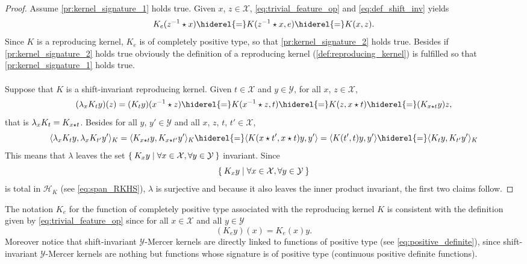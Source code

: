 \begin{proof}
    Assume \cref{pr:kernel_signature_1} holds true. Given $x$,
    $z\in\mathcal{X}$, \cref{eq:trivial_feature_op} and \cref{eq:def_shift_inv}
    yields
    \begin{dmath*}
        K_e(\inv{z}\groupop x)
        \hiderel{=}K(\inv{z} \groupop x,e)
        \hiderel{=}K(x,z).
    \end{dmath*}
    Since $K$ is a reproducing kernel, $K_e$ is of completely positive type, so
    that \cref{pr:kernel_signature_2} holds true. Besides if
    \cref{pr:kernel_signature_2} holds true obviously the definition of a
    reproducing kernel (\cref{def:reproducing_kernel}) is fulfilled so that
    \cref{pr:kernel_signature_1} holds true.
    \paragraph{}
    Suppose that $K$ is a shift-invariant reproducing kernel. Given
    $t\in\mathcal{X}$ and $y\in\mathcal{Y}$, for all $x$, $z\in\mathcal{X}$,
    \begin{dmath*}
        (\lambda_x K_t y)(z)=(K_t y)(\inv{x}\groupop z)
        \hiderel{=} K(\inv{x}\groupop z,t)
        \hiderel{=} K(z,x\groupop t)
        \hiderel{=} (K_{x\groupop t}y)z,
    \end{dmath*}
    that is $\lambda_xK_t=K_{x\star t}$. Besides for all $y$,
    $y'\in\mathcal{Y}$ and all $x$, $z$, $t$, $t'\in\mathcal{X}$,
    \begin{dmath*}
        \inner{\lambda_xK_ty, \lambda_xK_{t'}y'}_K=\inner{K_{x\groupop t}y,
        K_{x \groupop t'}y'}_K\hiderel{=}\inner{K(x \groupop t', x \groupop
        t)y,y'}=\inner{K(t',t)y, y'}\hiderel{=}\inner{K_ty, K_{t'}y'}_K
    \end{dmath*}
    This means that $\lambda$ leaves the set $\Set{K_xy|\forall
    x\in\mathcal{X}, \forall y\in\mathcal{Y}}$ invariant. Since
    \begin{dmath*}
        \Set{K_xy|\forall x\in\mathcal{X}, \forall y\in\mathcal{Y}}
    \end{dmath*}
    is total in $\mathcal{H}_K$ (see \cref{eq:span_RKHS}), $\lambda$ is
    surjective and because it also leaves the inner product invariant, the
    first two claims follow.
\end{proof}
The notation $K_e$ for the function of completely positive type associated with
the reproducing kernel $K$ is consistent with the definition given by
\cref{eq:trivial_feature_op} since for all $x\in\mathcal{X}$ and all
$y\in\mathcal{Y}$
\begin{dmath*}
    (K_ey)(x)=K_e(x)y.
\end{dmath*}
Moreover notice that shift-invariant $\mathcal{Y}$-Mercer kernels are directly
linked to functions of positive type (see \cref{eq:positive_definite}), since
shift-invariant $\mathcal{Y}$-Mercer kernels are nothing but functions
whose signature is of positive type (continuous positive definite functions).

